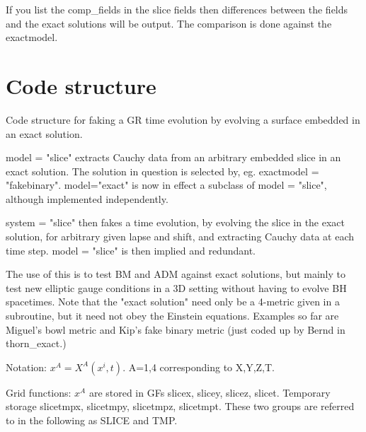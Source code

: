 If you list the comp\_fields in the slice fields then differences
between the fields and the exact solutions will be output. The
comparison is done against the exactmodel.


\section{Code structure}


Code structure for faking a GR time evolution by evolving a surface
embedded in an exact solution. 

model = "slice" extracts Cauchy data from an arbitrary embedded slice 
in an exact solution. The solution in question is selected by, eg.
exactmodel = "fakebinary". model="exact" is now in effect a subclass of
model = "slice", although implemented independently.

system = "slice" then fakes a time evolution, by evolving the slice in
the exact solution, for arbitrary given lapse and shift, and
extracting Cauchy data at each time step. model = "slice" is then
implied and redundant.

The use of this is to test BM and ADM against exact solutions, but
mainly to test new elliptic gauge conditions in a 3D setting without
having to evolve BH spacetimes. Note that the "exact solution" need
only be a 4-metric given in a subroutine, but it need not obey the
Einstein equations. Examples so far are Miguel's bowl metric and Kip's
fake binary metric (just coded up by Bernd in thorn\_exact.)

Notation: $x^A = X^A(x^i,t)$. A=1,4 corresponding to X,Y,Z,T. 

Grid functions: $x^A$ are stored in GFs slicex, slicey, slicez,
slicet.  Temporary storage slicetmpx, slicetmpy, slicetmpz,
slicetmpt. These two groups are referred to in the following as SLICE
and TMP.

